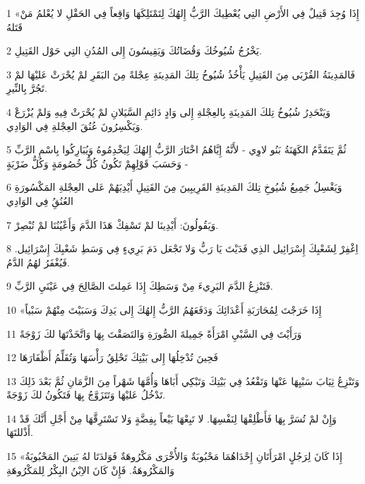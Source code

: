 \par 1 «إِذَا وُجِدَ قَتِيلٌ فِي الأَرْضِ التِي يُعْطِيكَ الرَّبُّ إِلهُكَ لِتَمْتَلِكَهَا وَاقِعاً فِي الحَقْلِ لا يُعْلمُ مَنْ قَتَلهُ
\par 2 يَخْرُجُ شُيُوخُكَ وَقُضَاتُكَ وَيَقِيسُونَ إِلى المُدُنِ التِي حَوْل القَتِيلِ.
\par 3 فَالمَدِينَةُ القُرْبَى مِنَ القَتِيلِ يَأْخُذُ شُيُوخُ تِلكَ المَدِينَةِ عِجْلةً مِنَ البَقَرِ لمْ يُحْرَثْ عَليْهَا لمْ تَجُرَّ بِالنِّيرِ.
\par 4 وَيَنْحَدِرُ شُيُوخُ تِلكَ المَدِينَةِ بِالعِجْلةِ إِلى وَادٍ دَائِمِ السَّيَلانِ لمْ يُحْرَثْ فِيهِ وَلمْ يُزْرَعْ وَيَكْسِرُونَ عُنُقَ العِجْلةِ فِي الوَادِي.
\par 5 ثُمَّ يَتَقَدَّمُ الكَهَنَةُ بَنُو لاوِي - لأَنَّهُ إِيَّاهُمُ اخْتَارَ الرَّبُّ إِلهُكَ لِيَخْدِمُوهُ وَيُبَارِكُوا بِاسْمِ الرَّبِّ وَحَسَبَ قَوْلِهِمْ تَكُونُ كُلُّ خُصُومَةٍ وَكُلُّ ضَرْبَةٍ -
\par 6 وَيَغْسِلُ جَمِيعُ شُيُوخِ تِلكَ المَدِينَةِ القَرِيبِينَ مِنَ القَتِيلِ أَيْدِيَهُمْ عَلى العِجْلةِ المَكْسُورَةِ العُنُقُِ فِي الوَادِي
\par 7 وَيَقُولُونَ: أَيْدِينَا لمْ تَسْفِكْ هَذَا الدَّمَ وَأَعْيُنُنَا لمْ تُبْصِرْ.
\par 8 اِغْفِرْ لِشَعْبِكَ إِسْرَائِيل الذِي فَدَيْتَ يَا رَبُّ وَلا تَجْعَل دَمَ بَرِيءٍ فِي وَسَطِ شَعْبِكَ إِسْرَائِيل. فَيُغْفَرُ لهُمُ الدَّمُ.
\par 9 فَتَنْزِعُ الدَّمَ البَرِيءَ مِنْ وَسَطِكَ إِذَا عَمِلتَ الصَّالِحَ فِي عَيْنَيِ الرَّبِّ.
\par 10 «إِذَا خَرَجْتَ لِمُحَارَبَةِ أَعْدَائِكَ وَدَفَعَهُمُ الرَّبُّ إِلهُكَ إِلى يَدِكَ وَسَبَيْتَ مِنْهُمْ سَبْياً
\par 11 وَرَأَيْتَ فِي السَّبْيِ امْرَأَةً جَمِيلةَ الصُّورَةِ وَالتَصَقْتَ بِهَا وَاتَّخَذْتَهَا لكَ زَوْجَةً
\par 12 فَحِينَ تُدْخِلُهَا إِلى بَيْتِكَ تَحْلِقُ رَأْسَهَا وَتُقَلِّمُ أَظْفَارَهَا
\par 13 وَتَنْزِعُ ثِيَابَ سَبْيِهَا عَنْهَا وَتَقْعُدُ فِي بَيْتِكَ وَتَبْكِي أَبَاهَا وَأُمَّهَا شَهْراً مِنَ الزَّمَانِ ثُمَّ بَعْدَ ذَلِكَ تَدْخُلُ عَليْهَا وَتَتَزَوَّجُ بِهَا فَتَكُونُ لكَ زَوْجَةً.
\par 14 وَإِنْ لمْ تُسَرَّ بِهَا فَأَطْلِقْهَا لِنَفْسِهَا. لا تَبِعْهَا بَيْعاً بِفِضَّةٍ وَلا تَسْتَرِقَّهَا مِنْ أَجْلِ أَنَّكَ قَدْ أَذْللتَهَا.
\par 15 «إِذَا كَانَ لِرَجُلٍ امْرَأَتَانِ إِحْدَاهُمَا مَحْبُوبَةٌ وَالأُخْرَى مَكْرُوهَةٌ فَوَلدَتَا لهُ بَنِينَ المَحْبُوبَةُ وَالمَكْرُوهَةُ. فَإِنْ كَانَ الاِبْنُ البِكْرُ لِلمَكْرُوهَةِ
